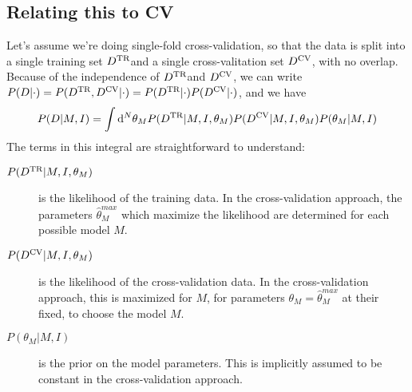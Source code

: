 \documentclass[12pt]{article}
\newcommand{\dd}{\mathrm{d}}
\newcommand{\Dtr}{\ensuremath{D^{\rm TR}}}
\newcommand{\Dcv}{\ensuremath{D^{\rm CV}}}
\begin{document}
\subsection{Relating this to CV}
Let's assume we're doing single-fold cross-validation, so that the data is
split into a single training set \Dtr and a single cross-valitation set
\Dcv, with no overlap.  Because of the independence of \Dtr and \Dcv, we can
write $P(D|\cdot) = P(\Dtr,\Dcv|\cdot) = P(\Dtr|\cdot)P(\Dcv|\cdot)$, and
we have
\begin{equation}
  P(D|M,I) = \int \dd^N\theta_M P(\Dtr|M, I, \theta_M) P(\Dcv|M,I,\theta_M)P(\theta_M|M,I)
\end{equation}
The terms in this integral are straightforward to understand:
\begin{description}
  \item[$P(\Dtr|M, I, \theta_M)$] is the likelihood of the training data.
    In the cross-validation approach, the parameters $\hat{\theta}^{max}_M$ which
    maximize the likelihood are determined for each possible model $M$.
  \item[$P(\Dcv|M, I, \theta_M)$] is the likelihood of the cross-validation
    data.  In the cross-validation approach, this is maximized for $M$,
    for parameters $\theta_M = \hat{\theta}^{max}_M$ at their fixed, to choose
    the model $M$.
  \item[$P(\theta_M|M,I)$] is the prior on the model parameters.  This is
    implicitly assumed to be constant in the cross-validation approach.
\end{description}
\end{document}

